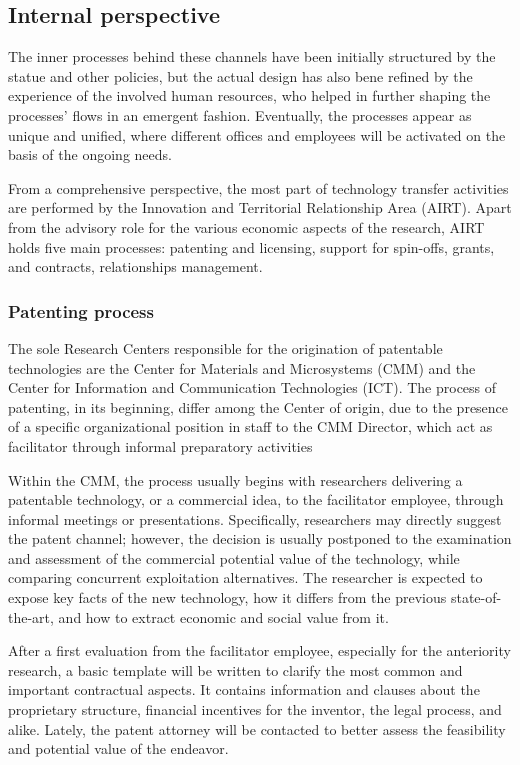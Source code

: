 \subsection{Internal perspective}

The inner processes behind these channels have been initially structured by the statue and other policies, but the actual design has also bene refined by the experience of the involved human resources, who helped in further shaping the processes' flows in an emergent fashion. Eventually, the processes appear as unique and unified, where different offices and employees will be activated on the basis of the ongoing needs. 

From a comprehensive perspective, the most part of technology transfer activities are performed by the Innovation and Territorial Relationship Area (AIRT). Apart from the advisory role for the various economic aspects of the research, AIRT holds five main processes: patenting and licensing, support for spin-offs, grants, and contracts, relationships management.

\subsubsection{Patenting process}

The sole Research Centers responsible for the origination of patentable technologies are the Center for Materials and Microsystems (CMM) and the Center for Information and Communication Technologies (ICT). The process of patenting, in its beginning, differ among the Center of origin, due to the presence of a specific organizational position in staff to the CMM Director, which act as facilitator through informal preparatory activities

Within the CMM, the process usually begins with researchers delivering a patentable technology, or a commercial idea, to the facilitator employee, through informal meetings or presentations. Specifically, researchers may directly suggest the patent channel; however, the decision is usually postponed to the examination and assessment of the commercial potential value of the technology, while comparing concurrent exploitation alternatives. The researcher is expected to expose key facts of the new technology, how it differs from the previous state-of-the-art, and how to extract economic and social value from it. 

After a first evaluation from the facilitator employee, especially for the anteriority research, a basic template will be written to clarify the most common and important contractual aspects. It contains information and clauses about the proprietary structure, financial incentives for the inventor, the legal process, and alike. Lately, the patent attorney will be contacted to better assess the feasibility and potential value of the endeavor. 

